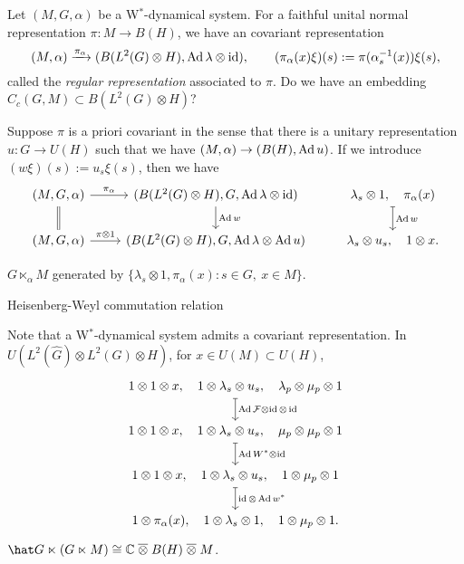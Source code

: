 \documentclass{../../large}
\begin{document}
\begin{prb}
Let $(M,G,\alpha)$ be a W$^*$-dynamical system.
For a faithful unital normal representation $\pi:M\to B(H)$, we have an covariant representation
\[(M,\alpha)\xrightarrow{\pi_\alpha}(B(L^2(G)\otimes H),\operatorname{Ad}\lambda\otimes\operatorname{id}),\qquad(\pi_\alpha(x)\xi)(s):=\pi(\alpha_s^{-1}(x))\xi(s),\]
called the \emph{regular representation} associated to $\pi$.
Do we have an embedding $C_c(G,M)\subset B(L^2(G)\otimes H)$?

Suppose $\pi$ is a priori covariant in the sense that there is a unitary representation $u:G\to U(H)$ such that we have $(M,\alpha)\to(B(H),\operatorname{Ad} u)$.
If we introduce $(w\xi)(s):=u_s\xi(s)$, then we have
\[\begin{tikzcd}
(M,G,\alpha) \rar{\pi_\alpha} \dar[equal]&
(B(L^2(G)\otimes H),G,\Ad\lambda\otimes\id) \dar{\Ad w} &
\lambda_s\otimes1,\quad\pi_\alpha(x) \dar[mapsto]{\Ad w}\\
(M,G,\alpha) \rar{\pi\otimes1} &
(B(L^2(G)\otimes H),G,\Ad\lambda\otimes\Ad u) &
\lambda_s\otimes u_s,\quad1\otimes x.
\end{tikzcd}\]
\begin{parts}
\item $G\ltimes_\alpha M$ generated by $\{\lambda_s\otimes1,\pi_\alpha(x):s\in G,\ x\in M\}$.
\end{parts}
\end{prb}


\begin{prb}
Heisenberg-Weyl commutation relation
\end{prb}
\begin{pf}
Note that a W$^*$-dynamical system admits a covariant representation.
In $U(L^2(\hat G)\otimes L^2(G)\otimes H)$, for $x\in U(M)\subset U(H)$,
\[\begin{tikzcd}
1\otimes1\otimes x,\quad1\otimes\lambda_s\otimes u_s,\quad\lambda_p\otimes\mu_p\otimes1 \dar[mapsto]{\Ad\cF\otimes\id\otimes\id} \\
1\otimes1\otimes x,\quad1\otimes\lambda_s\otimes u_s,\quad\mu_p\otimes\mu_p\otimes1 \dar[mapsto]{\Ad W^*\otimes\id} \\
1\otimes1\otimes x,\quad1\otimes\lambda_s\otimes u_s,\quad1\otimes\mu_p\otimes1 \dar[mapsto]{\id\otimes\Ad w^*} \\
1\otimes\pi_\alpha(x),\quad1\otimes\lambda_s\otimes1,\quad1\otimes\mu_p\otimes1.
\end{tikzcd}\]
$\hat G\ltimes(G\ltimes M)\cong\C\mathrel{\bar\otimes}B(H)\mathrel{\bar\otimes}M$.
\end{pf}
\end{document}
